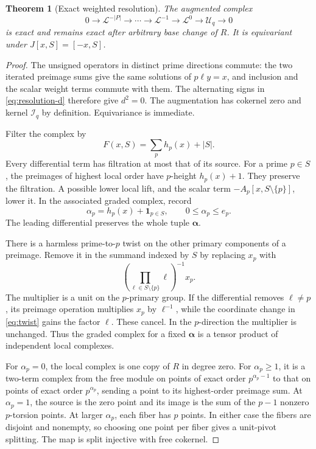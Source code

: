\documentclass[11pt]{article}
\numberwithin{equation}{section}
\newtheorem{theorem}{Theorem}[section]
\theoremstyle{definition}
\theoremstyle{remark}
\newcommand{\U}{\mathcal U}
\newcommand{\I}{\mathcal I}
\newcommand{\Lcal}{\mathcal L}
\begin{document}
\begin{theorem}[Exact weighted resolution]
\label{thm:resolution}
The augmented complex
\[
 0\longrightarrow\Lcal^{-|P|}\longrightarrow\cdots
 \longrightarrow\Lcal^{-1}\longrightarrow\Lcal^0
 \longrightarrow\U_q\longrightarrow0
\]
is exact and remains exact after arbitrary base change of $R$.
It is equivariant under $J[x,S]=[-x,S]$.
\end{theorem}
\begin{proof}
The unsigned operators in distinct prime directions commute: the two
iterated preimage sums give the same solutions of $p\ell y=x$, and
inclusion and the scalar weight terms commute with them. The alternating
signs in \eqref{eq:resolution-d} therefore give $d^2=0$. The augmentation
has cokernel zero and kernel $\I_q$ by definition. Equivariance is
immediate.

Filter the complex by
\[
 F(x,S)=\sum_p h_p(x)+|S|.
\]
Every differential term has filtration at most that of its source.
For a prime $p\in S$, the preimages of highest local order have
$p$-height $h_p(x)+1$. They preserve the filtration. A possible lower
local lift, and the scalar term $-A_p[x,S\setminus\{p\}]$, lower it.
In the associated graded complex, record
\[
 \alpha_p=h_p(x)+\boldsymbol1_{p\in S},\qquad0\le\alpha_p\le e_p.
\]
The leading differential preserves the whole tuple $\boldsymbol\alpha$.

There is a harmless prime-to-$p$ twist on the other primary components
of a preimage. Remove it in the summand indexed by $S$ by replacing
$x_p$ with
\begin{equation}
 \left(\prod_{\ell\in S\setminus\{p\}}\ell\right)^{-1}x_p.
 \label{eq:twist}
\end{equation}
The multiplier is a unit on the $p$-primary group. If the differential
removes $\ell\ne p$, its preimage operation multiplies $x_p$ by
$\ell^{-1}$, while the coordinate change in \eqref{eq:twist} gains the
factor $\ell$. These cancel. In the $p$-direction the multiplier is
unchanged. Thus the graded complex for a fixed
$\boldsymbol\alpha$ is a tensor product of independent local complexes.

For $\alpha_p=0$, the local complex is one copy of $R$ in degree zero.
For $\alpha_p\ge1$, it is a two-term complex from the free module on
points of exact order $p^{\alpha_p-1}$ to that on points of exact order
$p^{\alpha_p}$, sending a point to its highest-order preimage sum.
At $\alpha_p=1$, the source is the zero point and its image is the sum
of the $p-1$ nonzero $p$-torsion points. At larger $\alpha_p$, each
fiber has $p$ points. In either case the fibers are disjoint and
nonempty, so choosing one point per fiber gives a unit-pivot splitting.
The map is split injective with free cokernel.


\end{proof}
\end{document}
